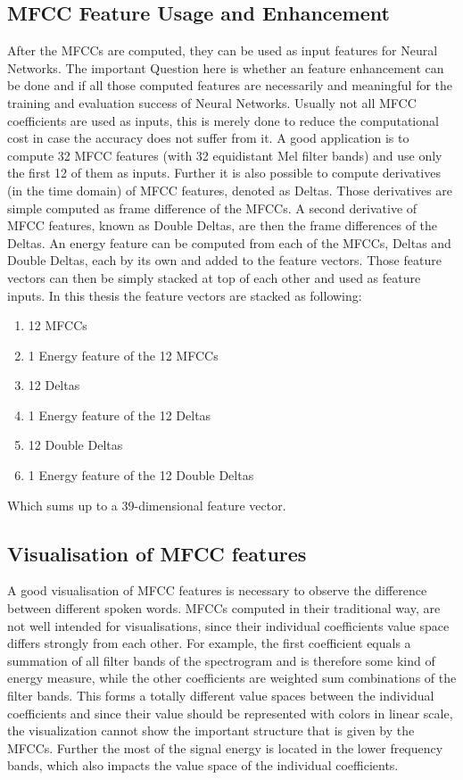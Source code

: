 \subsection{MFCC Feature Usage and Enhancement}
After the MFCCs are computed, they can be used as input features for Neural Networks. 
The important Question here is whether an feature enhancement can be done and if all those computed features are necessarily and meaningful for the training and evaluation success of Neural Networks. Usually not all MFCC coefficients are used as inputs, this is merely done to reduce the computational cost in case the accuracy does not suffer from it.
A good application is to compute 32 MFCC features (with 32 equidistant Mel filter bands) and use only the first 12 of them as inputs.
Further it is also possible to compute derivatives (in the time domain) of MFCC features, denoted as Deltas. 
Those derivatives are simple computed as frame difference of the MFCCs.
A second derivative of MFCC features, known as Double Deltas, are then the frame differences of the Deltas.
An energy feature can be computed from each of the MFCCs, Deltas and Double Deltas, each by its own and added to the feature vectors.
Those feature vectors can then be simply stacked at top of each other and used as feature inputs.
In this thesis the feature vectors are stacked as following:
\begin{enumerate}
    \item 12 MFCCs
    \item 1 Energy feature of the 12 MFCCs
    \item 12 Deltas
    \item 1 Energy feature of the 12 Deltas
    \item 12 Double Deltas
    \item 1 Energy feature of the 12 Double Deltas
\end{enumerate}
Which sums up to a 39-dimensional feature vector.

\subsection{Visualisation of MFCC features}
A good visualisation of MFCC features is necessary to observe the difference between different spoken words.
MFCCs computed in their traditional way, are not well intended for visualisations, since their individual coefficients value space differs strongly from each other.
For example, the first coefficient equals a summation of all filter bands of the spectrogram and is therefore some kind of energy measure, while the other coefficients are weighted sum combinations of the filter bands.
This forms a totally different value spaces between the individual coefficients and since their value should be represented with colors in linear scale, the visualization cannot show the important structure that is given by the MFCCs.
Further the most of the signal energy is located in the lower frequency bands, which also impacts the value space of the individual coefficients.


